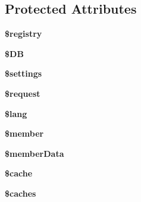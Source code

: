\subsection*{Protected Attributes}
\begin{DoxyCompactItemize}
\item 
\hypertarget{classapp__class__forums_a531e4a386aaa7f3e06d3642dc38d7e80}{{\bfseries \$registry}}\label{classapp__class__forums_a531e4a386aaa7f3e06d3642dc38d7e80}

\item 
\hypertarget{classapp__class__forums_a7dc56dc8b18ad37272b56fa7395bedef}{{\bfseries \$\-D\-B}}\label{classapp__class__forums_a7dc56dc8b18ad37272b56fa7395bedef}

\item 
\hypertarget{classapp__class__forums_ac7c3353107070daa85f641882931b358}{{\bfseries \$settings}}\label{classapp__class__forums_ac7c3353107070daa85f641882931b358}

\item 
\hypertarget{classapp__class__forums_abb35c8495a232b510389fa6d7b15d38a}{{\bfseries \$request}}\label{classapp__class__forums_abb35c8495a232b510389fa6d7b15d38a}

\item 
\hypertarget{classapp__class__forums_a7714b111b644017933931ec69a154102}{{\bfseries \$lang}}\label{classapp__class__forums_a7714b111b644017933931ec69a154102}

\item 
\hypertarget{classapp__class__forums_a5e1c849c6148a8732eee400fcee0d044}{{\bfseries \$member}}\label{classapp__class__forums_a5e1c849c6148a8732eee400fcee0d044}

\item 
\hypertarget{classapp__class__forums_ae9d848ba2cf6eee63bdc060e2dfcf95a}{{\bfseries \$member\-Data}}\label{classapp__class__forums_ae9d848ba2cf6eee63bdc060e2dfcf95a}

\item 
\hypertarget{classapp__class__forums_ac2dc76d756ec398393d4b1d23659276c}{{\bfseries \$cache}}\label{classapp__class__forums_ac2dc76d756ec398393d4b1d23659276c}

\item 
\hypertarget{classapp__class__forums_a0334a912b7c2d39a9bc71177578d782e}{{\bfseries \$caches}}\label{classapp__class__forums_a0334a912b7c2d39a9bc71177578d782e}

\end{DoxyCompactItemize}


